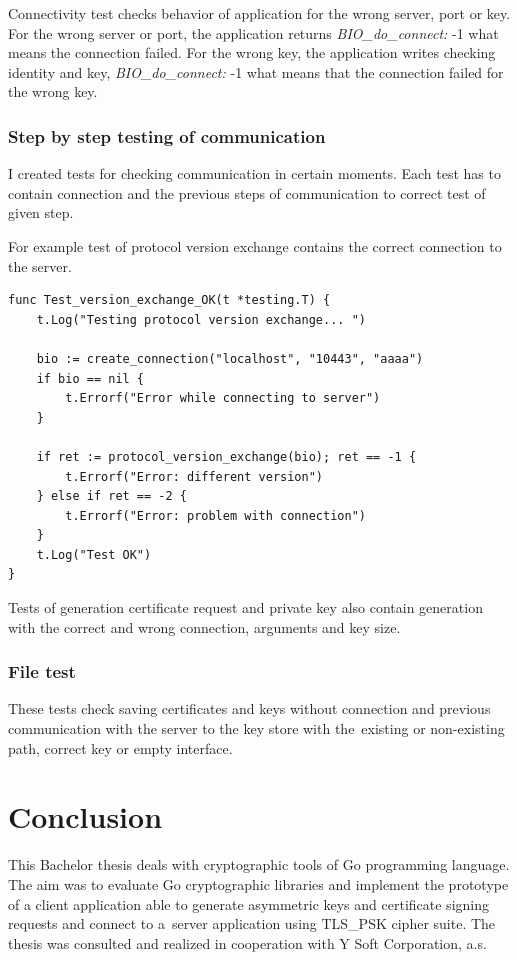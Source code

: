 \documentclass[
  oneside, 12pt, 
  printed, %
  notable,   %
  nolof,     %
  nolot,     %
]{fithesis3}
\begin{document}
Connectivity test checks behavior of application for the wrong server, port or key. For the wrong 
server or port, the application returns \textit{BIO\_do\_connect:} -1 what means the connection 
failed. For the wrong key, the application writes checking identity and key, 
\textit{BIO\_do\_connect:} -1 what means that the connection failed for the wrong key.

\subsection{Step by step testing of communication}

I created tests for checking communication in certain moments. Each test has to contain connection 
and the previous steps of communication to correct test of given step.

For example test of protocol version exchange contains the correct connection to the server.
\begin{lstlisting}
func Test_version_exchange_OK(t *testing.T) {
	t.Log("Testing protocol version exchange... ")
		
	bio := create_connection("localhost", "10443", "aaaa")
	if bio == nil {
		t.Errorf("Error while connecting to server")
	}
	
	if ret := protocol_version_exchange(bio); ret == -1 {
		t.Errorf("Error: different version")
	} else if ret == -2 {
		t.Errorf("Error: problem with connection")
	} 
	t.Log("Test OK")
}
\end{lstlisting}

Tests of generation certificate request and private key also contain generation with the correct 
and wrong connection, arguments and key size.

\subsection{File test}
These tests check saving certificates and keys without connection and previous communication with 
the server to the key store with the~existing or non-existing path, correct key or empty 
interface. 





\chapter{Conclusion}
This Bachelor thesis deals with cryptographic tools of Go programming language. The aim was to 
evaluate Go cryptographic libraries and implement the prototype of a client application able to 
generate asymmetric keys and certificate signing requests and connect to a~server application 
using TLS\_PSK cipher suite. The thesis was consulted and realized in cooperation with Y Soft 
Corporation, a.s.
\end{document}
